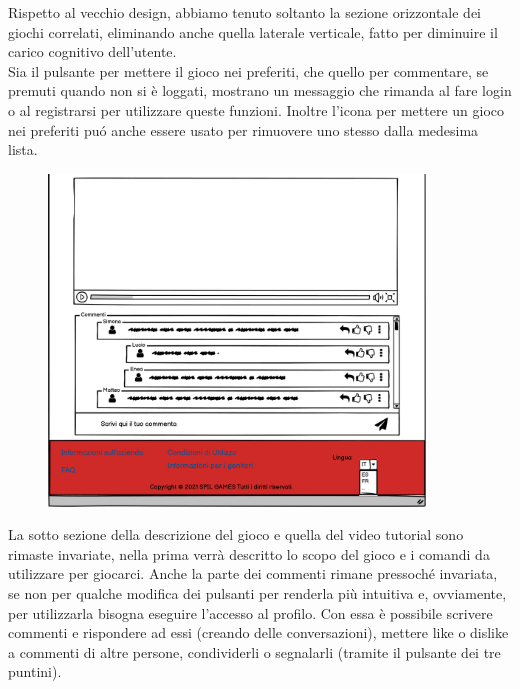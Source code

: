 \documentclass[../Report.tex]{subfiles}
\begin{document}
    Rispetto al vecchio design, abbiamo tenuto soltanto la sezione orizzontale dei giochi correlati, eliminando anche quella laterale verticale, fatto per diminuire il carico cognitivo dell'utente.\\
    Sia il pulsante per mettere il gioco nei preferiti, che quello per commentare, se premuti quando non si è loggati, mostrano un messaggio che rimanda al fare login o al registrarsi  per utilizzare queste funzioni.
    Inoltre l'icona per mettere un gioco nei preferiti puó anche essere usato per rimuovere uno stesso dalla medesima lista.
    \begin{figure}[H]
        \includegraphics[width=10cm]{WGioco_2.png}
        \centering
    \end{figure}

    La sotto sezione della descrizione del gioco e quella del video tutorial sono rimaste invariate, nella prima verrà descritto lo scopo del gioco e i comandi da utilizzare per giocarci. Anche la parte dei commenti rimane pressoché invariata, se non per qualche modifica dei pulsanti per renderla più intuitiva e, ovviamente, per utilizzarla bisogna eseguire l'accesso al profilo. Con essa è possibile scrivere commenti e rispondere ad essi (creando delle conversazioni), mettere like o dislike a commenti di altre persone, condividerli o segnalarli (tramite il pulsante dei tre puntini).
\end{document}
